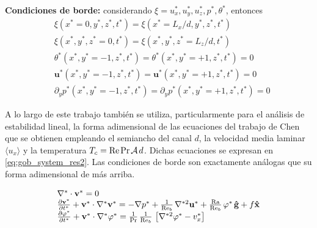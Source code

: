 \textbf{Condiciones de borde:} considerando $\xi= u^*_x, u^*_y, u^*_z, p^*, \theta^*$, entonces
\begin{align}
&\xi(x^*=0,y^*,z^*,t^*) = \xi(x^*=L_x/d,y^*,z^*,t^*) 
	\label{eq:bc_1} \\
&\xi(x^*,y^*,z^*=0,t^*) = \xi(x^*,y^*,z^*=L_z/d,t^*) 
	\label{eq:bc_2} \\
&\theta^*(x^*,y^*=-1,z^*,t^*)       = \theta^*(x^*,y^*=+1,z^*,t^*) = 0
	\label{eq:bc_3} \\
&\mathbf{u^*}(x^*,y^*=-1,z^*,t^*)   = \mathbf{u^*}(x^*,y^*=+1,z^*,t^*) = 0
	\label{eq:bc_4} \\
&\partial_y p^*(x^*,y^*=-1,z^*,t^*) = \partial_y p^*(x^*,y^*=+1,z^*,t^*) = 0
	\label{eq:bc_5}
\end{align}

A lo largo de este trabajo también se utiliza, particularmente para el análisis de estabilidad lineal, la forma adimensional de las ecuaciones del trabajo de Chen \cite{chen1996linear} que se obtienen empleando el  semiancho del canal $d$, la velocidad media laminar $\langle u_x \rangle$ y la temperatura $T_c = \text{Re} \hspace{0.5mm} \text{Pr} \hspace{0.5mm} \mathcal{A} \hspace{0.5mm} d$. Dichas ecuaciones se expresan en \ref{eq:gob_system_res2}. Las condiciones de borde son exactamente análogas que su forma adimensional de más arriba.

\begin{equation}
\begin{array}{l}
    \nabla^* \cdot \mathbf{v^*} = 0 \\
    \frac{\partial \mathbf{v^*}}{\partial t^*} + \mathbf{v^*} \cdot \nabla^* \mathbf{v^*} = 
    -\nabla p^* + \frac{1}{\text{Re}_b} \hspace{0.5mm} \nabla^{*2} \mathbf{u^*} + \frac{\text{Ra}}{\text{Re}_b} \hspace{0.5mm} \varphi^* \hspace{0.5mm} \mathbf{\hat{g}} + f \mathbf{\hat{x}} \\
    \frac{\partial \varphi^*}{\partial t^*} + \mathbf{v^*} \cdot \nabla^* \varphi^* = 
    \frac{1}{\text{Pr}}\hspace{0.5mm}  \frac{1}{\text{Re}_b} \hspace{0.5mm} \left[ \nabla^{*2} \varphi^* - v_x^* \right]  
\end{array}
\label{eq:gob_system_res2}
\end{equation}

